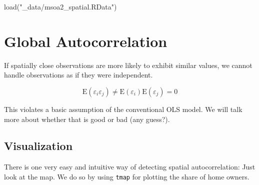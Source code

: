 \documentclass[
  letterpaper,
  DIV=11,
  numbers=noendperiod]{scrreprt}
\newenvironment{Shaded}{\begin{snugshade}}{\end{snugshade}}
\newcommand{\FunctionTok}[1]{\textcolor[rgb]{0.28,0.35,0.67}{#1}}
\newcommand{\NormalTok}[1]{\textcolor[rgb]{0.00,0.23,0.31}{#1}}
\newcommand{\StringTok}[1]{\textcolor[rgb]{0.13,0.47,0.30}{#1}}
\begin{document}
\begin{Shaded}
\begin{Highlighting}[]
\FunctionTok{load}\NormalTok{(}\StringTok{"\_data/msoa2\_spatial.RData"}\NormalTok{)}
\end{Highlighting}
\end{Shaded}

\hypertarget{global-autocorrelation}{%
\section{Global Autocorrelation}\label{global-autocorrelation}}

If spatially close observations are more likely to exhibit similar
values, we cannot handle observations as if they were independent.

\[ 
\mathrm{E}(\varepsilon_i\varepsilon_j)\neq \mathrm{E}(\varepsilon_i)\mathrm{E}(\varepsilon_j) = 0
\]

This violates a basic assumption of the conventional OLS model. We will
talk more about whether that is good or bad (any guess?).

\hypertarget{visualization-1}{%
\subsection{Visualization}\label{visualization-1}}

There is one very easy and intuitive way of detecting spatial
autocorrelation: Just look at the map. We do so by using \texttt{tmap}
for plotting the share of home owners.
\end{document}
